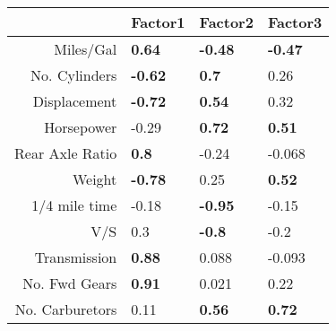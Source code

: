 \begin{tabular}{rlll}
  \hline
 & Factor1 & Factor2 & Factor3 \\ 
  \hline
Miles/Gal & \textbf{0.64} & \textbf{-0.48} & \textbf{-0.47} \\ 
  No. Cylinders & \textbf{-0.62} & \textbf{0.7} & 0.26 \\ 
  Displacement & \textbf{-0.72} & \textbf{0.54} & 0.32 \\ 
  Horsepower & -0.29 & \textbf{0.72} & \textbf{0.51} \\ 
  Rear Axle Ratio & \textbf{0.8} & -0.24 & -0.068 \\ 
  Weight & \textbf{-0.78} & 0.25 & \textbf{0.52} \\ 
  1/4 mile time & -0.18 & \textbf{-0.95} & -0.15 \\ 
  V/S & 0.3 & \textbf{-0.8} & -0.2 \\ 
  Transmission & \textbf{0.88} & 0.088 & -0.093 \\ 
  No. Fwd Gears & \textbf{0.91} & 0.021 & 0.22 \\ 
  No. Carburetors & 0.11 & \textbf{0.56} & \textbf{0.72} \\ 
   \hline
\end{tabular}

